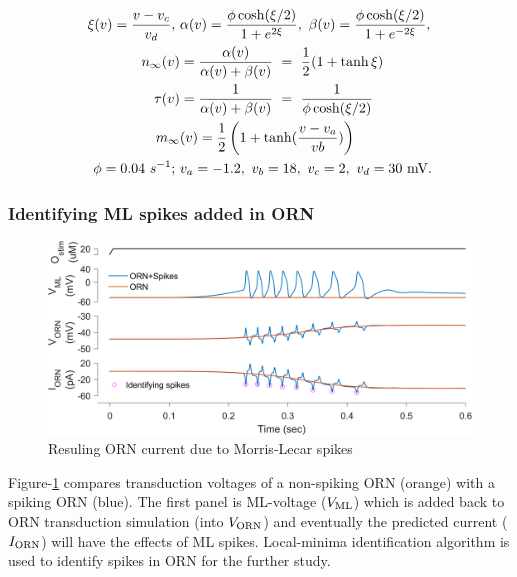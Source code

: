 \documentclass[
]{article}
\begin{document}
\begin{equation} \label{eq:MLfxn}
\begin{split}
\xi(v)=\frac{v-v_c}{v_d},\ &\alpha(v)=\frac{\phi \cosh(\xi/2)}{1+ e^{2\xi}},\ \beta(v)=\frac{\phi \cosh(\xi/2)}{1+ e^{-2\xi}}, \\
n_\infty(v) &= \frac{\alpha(v)}{\alpha(v)+\beta(v)}\ =\  \frac12(1 + \tanh \xi) \\
\tau(v) &= \frac{1}{\alpha(v) + \beta(v)}\ =\  \frac{1}{\phi \cosh(\xi/2)} \\
m_\infty&(v) = \frac12\left(1+ \tanh(\frac{v-v_a}{vb})\right) \\ 
\phi=0.04\ s^{-1};\ &v_a=-1.2,\ v_b=18,\ v_c=2,\ v_d=30\ {\rm mV}.
\end{split}
\end{equation}

\hypertarget{identifying-ml-spikes-added-in-orn}{%
\subsubsection{Identifying ML spikes added in ORN}\label{identifying-ml-spikes-added-in-orn}}

\begin{figure}

{\centering \includegraphics[width=0.9\linewidth]{figs/v1/fig_ML_spikes_with_ORN} 

}

\caption{Resuling ORN current due to Morris-Lecar spikes}\label{fig:MLspkORN}
\end{figure}

Figure-\ref{fig:MLspkORN} compares transduction voltages of a non-spiking ORN (orange) with a spiking ORN (blue). The first panel is ML-voltage (\(V_{\rm ML}\)) which is added back to ORN transduction simulation (into \(V_{\rm ORN}\)) and eventually the predicted current (\(I_{\rm ORN}\)) will have the effects of ML spikes. Local-minima identification algorithm is used to identify spikes in ORN for the further study.
\end{document}
